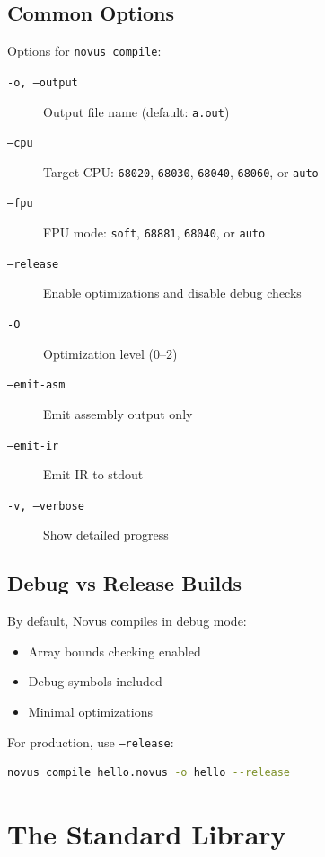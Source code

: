 \subsection{Common Options}

Options for \texttt{novus compile}:

\begin{description}
    \item[\texttt{-o, --output}] Output file name (default: \texttt{a.out})
    \item[\texttt{--cpu}] Target CPU: \texttt{68020}, \texttt{68030}, \texttt{68040}, \texttt{68060}, or \texttt{auto}
    \item[\texttt{--fpu}] FPU mode: \texttt{soft}, \texttt{68881}, \texttt{68040}, or \texttt{auto}
    \item[\texttt{--release}] Enable optimizations and disable debug checks
    \item[\texttt{-O}] Optimization level (0--2)
    \item[\texttt{--emit-asm}] Emit assembly output only
    \item[\texttt{--emit-ir}] Emit IR to stdout
    \item[\texttt{-v, --verbose}] Show detailed progress
\end{description}

\subsection{Debug vs Release Builds}

By default, Novus compiles in debug mode:
\begin{itemize}
    \item Array bounds checking enabled
    \item Debug symbols included
    \item Minimal optimizations
\end{itemize}

For production, use \texttt{--release}:

\begin{lstlisting}[language=bash]
novus compile hello.novus -o hello --release
\end{lstlisting}

\section{The Standard Library}
\label{sec:stdlib}

